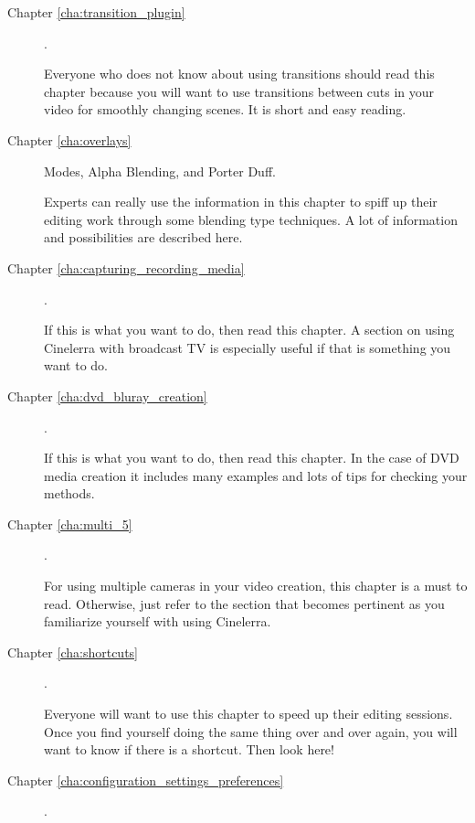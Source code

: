 \begin{description}
    \item[Chapter \ref{cha:transition_plugin}] .

        Everyone who does not know about using transitions should read this chapter because you will want to use transitions between cuts in your video for smoothly changing scenes. 
        It is short and easy reading.

    \item[Chapter \ref{cha:overlays}]  Modes, Alpha Blending, and Porter Duff.

        Experts can really use the information in this chapter to spiff up their editing work through some blending type techniques. 
        A lot of information and possibilities are described here.

    \item[Chapter \ref{cha:capturing_recording_media}] .

        If this is what you want to do, then read this chapter. 
        A section on using Cinelerra with broadcast TV is especially useful if that is something you want to do.

    \item[Chapter \ref{cha:dvd_bluray_creation}] .

        If this is what you want to do, then read this chapter. 
        In the case of DVD media creation it includes many examples and lots of tips for checking your methods. 

    \item[Chapter \ref{cha:multi_5}] .

        For using multiple cameras in your video creation, this chapter is a must to read. Otherwise, just refer
        to the section that becomes pertinent as you familiarize yourself with using Cinelerra.

    \item[Chapter \ref{cha:shortcuts}] .

        Everyone will want to use this chapter to speed up their editing sessions. 
        Once you find yourself doing the same thing over and over again, you will want to know if there is a shortcut. Then look here!  

    \item[Chapter \ref{cha:configuration_settings_preferences}] .


\end{description}
